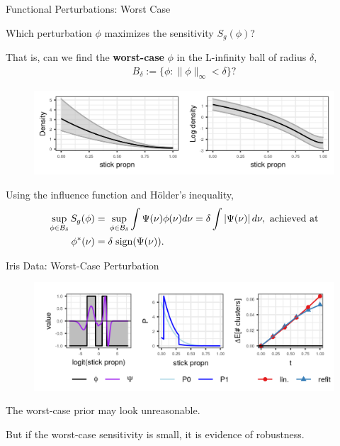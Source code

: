 \begin{frame}{Functional Perturbations: Worst Case \citep{gustafson:1996:local}}

Which perturbation $\phi$ maximizes the sensitivity $S_g(\phi)$?

\pause
That is, can we find the {\bf worst-case} $\phi$ in the L-infinity ball of radius $\delta$,
%
\begin{align*}
  B_\delta := \{\phi : \|\phi\|_\infty < \delta\}?
\end{align*}

\vspace{-1em}

\pause
\begin{figure}[!h]
\centering
\includegraphics[width = 1.0\textwidth]{./figure/func_ball-1.png}
\setlength{\textfloatsep}{-10pt}
\end{figure}

\vspace{-2em}

\pause
Using the influence function and H{\"o}lder's inequality,
%
\begin{align*}
%
\sup_{\phi \in \ball_\delta} S_g(\phi) ={}&
\sup_{\phi \in \ball_\delta} \int \infl(\nu)\phi(\nu) d\nu
= \delta \int \abs{\infl(\nu)} d\nu, \textrm{ achieved at} \\
\phi^*(\nu) ={}& \delta \; \mathrm{sign}(\infl(\nu)).
%
\end{align*}
%
%
\end{frame}






\begin{frame}{Iris Data: Worst-Case Perturbation}
  \begin{figure}[!h]
    \centering
    \includegraphics[width = \textwidth]{./figure/iris_worstcase-1.png}
\end{figure}

\pause

The worst-case prior may look unreasonable.  

But if the worst-case sensitivity is small, it is evidence of robustness.
\end{frame}